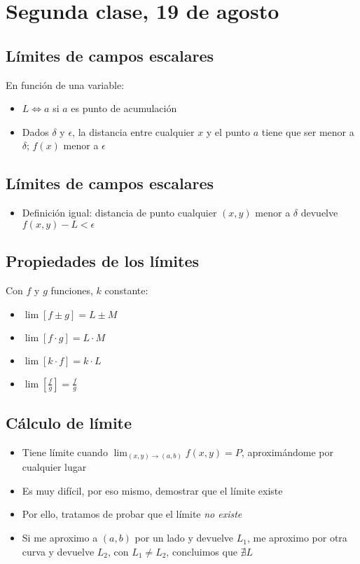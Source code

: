 \section{Segunda clase, 19 de agosto}

\subsection{Límites de campos escalares}

En función de una variable:
\begin{itemize}
    \item \(L \iff a\) si \(a\) es punto de acumulación
    \item Dados \(\delta\) y \(\epsilon\),
          la distancia entre cualquier \(x\) y el punto \(a\) tiene que ser menor a
          \(\delta\); \(f(x)\) menor a \(\epsilon\)
\end{itemize}

\subsection{Límites de campos escalares}

\begin{itemize}
    \item Definición igual: distancia de punto cualquier \((x,y)\) menor a
          \(\delta\) devuelve \(f(x,y) - L < \epsilon\)
\end{itemize}

\subsection{Propiedades de los límites}

Con \(f\) y \(g\) funciones, \(k\) constante:
\begin{itemize}
    \item \(\lim\left[f \pm g\right] = L \pm M\)
    \item \(\lim\left[f \cdot g\right] = L \cdot M\)
    \item \(\lim\left[k \cdot f\right] = k \cdot L\)
    \item \(\lim\left[\frac{f}{g}\right] = \frac{f}{g}\)
\end{itemize}

\subsection{Cálculo de límite}

\begin{itemize}
    \item Tiene límite cuando \(\lim_{(x,y) \to (a,b)} f(x,y) = P\),
          aproximándome por cualquier lugar
    \item Es muy difícil, por eso mismo, demostrar que el límite existe
    \item Por ello, tratamos de probar que el límite \textit{no existe}
    \item Si me aproximo a \((a,b)\) por un lado y devuelve \(L_1\),
          me aproximo por otra curva y devuelve \(L_2\), con \(L_1 \neq L_2\),
          concluimos que \(\nexists L\)
\end{itemize}

